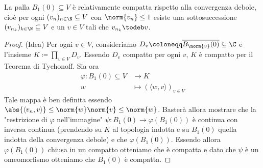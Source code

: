\begin{thm} \label{thm:Banach-Alouglu-facile}
    La palla $ B_1(0) \subseteq V $ è relativamente compatta rispetto alla convergenza debole, cioè per ogni $ (v_n)_{n \in \N} \subseteq V $ con $ \norm{v_n} \leq 1 $ esiste una sottosuccessione $ (v_{n_k})_{k \in \N} \subseteq V $ e un $ v \in V $ tali che $ v_{n_k} \todeb v $. 
\end{thm}
\begin{proof}
    (Idea)
    Per ogni $ v \in V $, consideriamo $ D_v \coloneqq \overline{B_{\norm{v}}(0)} \subseteq \C $ e l'insieme $ K \coloneqq \prod_{v \in V} D_v $. Essendo $ D_v $ compatto per ogni $ v $, $ K $ è compatto per il Teorema di Tychonoff. Sia ora 
    \begin{align*}
        \varphi \colon B_1(0) \subseteq V & \to K \\
        w & \mapsto ({\langle w, v \rangle})_{v \in V}
    \end{align*}   
    Tale mappa è ben definita essendo $ \abs{{\langle v_n, v \rangle}} \leq \norm{w} \norm{v} \leq \norm{w} $. Basterà allora mostrare che la "restrizione di $ \varphi $ nell'immagine" $ \psi \colon B_1(0) \to \varphi(B_1(0)) $ è continua con inversa continua (prendendo su $ K $ al topologia indotta e su $ B_1(0) $ quella indotta della convergenza debole) e che $ \varphi(B_1(0)) $. Essendo allora $ \varphi(B_1(0)) $ chiusa in un compatto otteniamo che è compatta e dato che $ \psi $ è un omeomorfismo otteniamo che $ B_1(0) $ è compatta. 
\end{proof}

